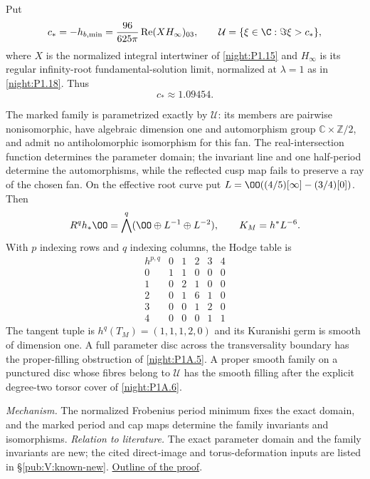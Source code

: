 \hypertarget{main-V-E}{}
\begin{maintheorem}
\hypertarget{tag-03KV}{}\label{series:V:E}
Put
\[
 c_*=-h_{b,\min}=\frac{96}{625\pi}\operatorname{Re}(XH_\infty)_{03},
 \qquad \mathcal U=\{\xi\in\C:\Im\xi>c_*\},
\]
where $X$ is the normalized integral intertwiner of
\cref{night:P1.15} and $H_\infty$ is its regular infinity-root
fundamental-solution limit, normalized at $\lambda=1$ as in
\cref{night:P1.18}. Thus
\[c_*\approx1.09454.\]

The marked family is parametrized exactly by $\mathcal U$:
its members are pairwise nonisomorphic, have algebraic dimension one
and automorphism group $\mathbb C\times\mathbb Z/2$, and admit no
antiholomorphic isomorphism for this fan.  The real-intersection
function determines the parameter domain; the invariant line and
one half-period determine the automorphisms, while the reflected cusp map fails to preserve a ray of the chosen fan.
On the effective root curve put
$L=\OO((4/5)[\infty]-(3/4)[0])$. Then
\[
 R^qh_*\OO=\bigwedge^q(\OO\oplus L^{-1}\oplus L^{-2}),
 \qquad K_M=h^*L^{-6}.
\]
With $p$ indexing rows and $q$ indexing columns, the Hodge table is
\[
\begin{array}{c|ccccc}
h^{p,q}&0&1&2&3&4\\\hline
0&1&1&0&0&0\\
1&0&2&1&0&0\\
2&0&1&6&1&0\\
3&0&0&1&2&0\\
4&0&0&0&1&1
\end{array}
\]
The tangent tuple is $h^q(T_M)=(1,1,1,2,0)$ and its Kuranishi germ
is smooth of dimension one. A full parameter disc across the
transversality boundary has the proper-filling obstruction of
\cref{night:P1A.5}. A proper smooth family on a punctured disc
whose fibres belong to $\mathcal U$ has the smooth filling after
the explicit degree-two torsor cover of \cref{night:P1A.6}.


\end{maintheorem}

\textit{Mechanism.} The normalized Frobenius period minimum fixes the exact domain, and the marked period and cap maps determine the family invariants and isomorphisms.
\textit{Relation to literature.} The exact parameter domain and the family invariants are new; the cited direct-image and torus-deformation inputs are listed in \S\ref{pub:V:known-new}.
\hyperlink{outline-V-E}{Outline of the proof}.

